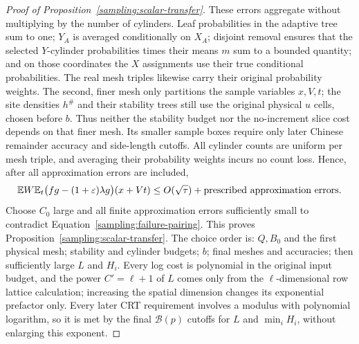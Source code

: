 \begin{proof}[Proof of Proposition~\ref{sampling:scalar-transfer}]
These errors aggregate without multiplying by the number of cylinders.
Leaf probabilities in the adaptive tree sum to one; $Y_A$ is averaged
conditionally on $X_A$; disjoint removal ensures that the selected
$Y$-cylinder probabilities times their means $m$ sum to a bounded quantity;
and on those coordinates the $X$ assignments use their true conditional
probabilities.  The real mesh triples likewise carry their original
probability weights.  The second, finer mesh only partitions the sample
variables $x,V,t$; the site densities $h^\#$ and their stability trees
still use the original physical $u$ cells, chosen before $b$.  Thus neither
the stability budget nor the no-increment slice cost depends on that finer
mesh.  Its smaller sample boxes require only later Chinese remainder
accuracy and side-length cutoffs.  All cylinder counts are uniform per
mesh triple, and averaging their probability weights incurs no count loss.  Hence, after all approximation errors are included,
\[
 \mathbb E W\mathbb E_t\bigl(fg-(1+\varepsilon)\lambda g\bigr)(x+Vt)
 \le O(\sqrt\tau)+\text{prescribed approximation errors}.
\]
Choose $C_0$ large and all finite approximation errors sufficiently small
to contradict Equation~\eqref{sampling:failure-pairing}.
This proves Proposition~\ref{sampling:scalar-transfer}.  The choice order is:
$Q,B_0$ and the first physical mesh; stability and cylinder budgets;
$b$; final meshes and accuracies; then sufficiently large $L$ and $H_i$.
Every log cost is polynomial in the original input budget, and the power
$C'=\ell+1$ of $L$ comes only from the $\ell$-dimensional row lattice
calculation; increasing the spatial dimension changes its exponential
prefactor only.  Every later CRT requirement involves a modulus with
polynomial logarithm, so it is met by the final $\mathcal B(p)$ cutoffs
for $L$ and $\min_iH_i$, without enlarging this exponent.
\end{proof}
